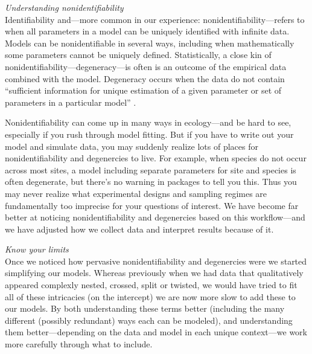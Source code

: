 \documentclass[11pt]{article}
\begin{document}
{ \emph{Understanding nonidentifiability} \\
Identifiability and---more common in our experience: nonidentifiability---refers to when all parameters in a model can be uniquely identified with infinite data. Models can be nonidentifiable in several ways, including when mathematically some parameters cannot be uniquely defined. Statistically, a close kin of nonidentifiability---degeneracy---is often is an outcome of the empirical data combined with the model. Degeneracy occurs when the data do not contain ``sufficient information for unique estimation of a given parameter or set of parameters in a particular model'' \citep{gelmanhill}. 

Nonidentifiability can come up in many ways in ecology---and be hard to see, especially if you rush through model fitting. But if you have to write out your model and simulate data, you may suddenly realize lots of places for nonidentifiability and degenercies to live. For example, when species do not occur across most sites, a model including separate parameters for site and species is often degenerate, but there's no warning in packages to tell you this. Thus you may never realize what experimental designs and sampling regimes are fundamentally too imprecise for your questions of interest. We have become far better at noticing nonidentifiability and degenercies based on this workflow---and we have adjusted how we collect data and interpret results because of it. %

 \emph{Know your limits} \\ %
Once we noticed how pervasive nonidentifiability and degenercies were we started simplifying our models. Whereas previously when we had data that qualitatively appeared complexly nested, crossed, split or twisted, we would have tried to fit all of these intricacies (on the intercept) we are now more slow to add these to our models. By both understanding these terms better (including the many different (possibly redundant) ways each can be modeled), and understanding them better---depending on the data and model in each unique context---we work more carefully through what to include. %

}
\end{document}
